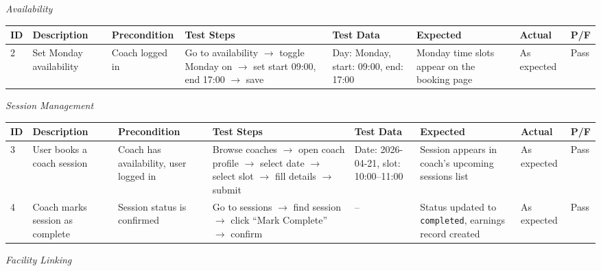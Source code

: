 \documentclass[12pt,a4paper]{report}
\begin{document}
\textit{Availability}

\begin{center}
\footnotesize
\begin{longtable}{p{0.4cm} p{2.2cm} p{1.8cm} p{3.2cm} p{2.2cm} p{2.2cm} p{1.4cm} p{0.8cm}}
\toprule
\textbf{ID} & \textbf{Description} & \textbf{Precondition} & \textbf{Test Steps} & \textbf{Test Data} & \textbf{Expected} & \textbf{Actual} & \textbf{P/F}\\
\midrule
\endhead
2 & Set Monday availability & Coach logged in & Go to availability $\to$ toggle Monday on $\to$ set start 09:00, end 17:00 $\to$ save & Day: Monday, start: 09:00, end: 17:00 & Monday time slots appear on the booking page & As expected & Pass\\
\bottomrule
\end{longtable}
\end{center}

\textit{Session Management}

\begin{center}
\footnotesize
\begin{longtable}{p{0.4cm} p{2.2cm} p{1.8cm} p{3.2cm} p{2.2cm} p{2.2cm} p{1.4cm} p{0.8cm}}
\toprule
\textbf{ID} & \textbf{Description} & \textbf{Precondition} & \textbf{Test Steps} & \textbf{Test Data} & \textbf{Expected} & \textbf{Actual} & \textbf{P/F}\\
\midrule
\endhead
3 & User books a coach session & Coach has availability, user logged in & Browse coaches $\to$ open coach profile $\to$ select date $\to$ select slot $\to$ fill details $\to$ submit & Date: 2026-04-21, slot: 10:00--11:00 & Session appears in coach's upcoming sessions list & As expected & Pass\\[4pt]
4 & Coach marks session as complete & Session status is confirmed & Go to sessions $\to$ find session $\to$ click ``Mark Complete'' $\to$ confirm & -- & Status updated to \texttt{completed}, earnings record created & As expected & Pass\\
\bottomrule
\end{longtable}
\end{center}

\textit{Facility Linking}
\end{document}
